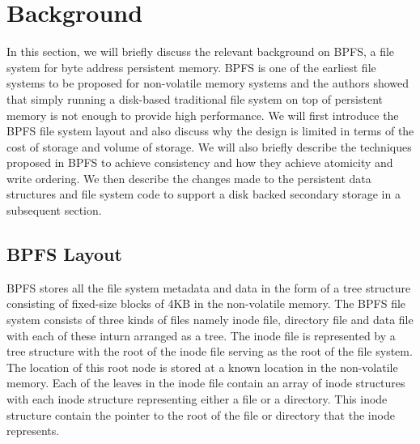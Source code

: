 \section{Background}
\label{sec-bg}
In this section, we will briefly discuss the relevant background on BPFS, a file system for byte address persistent memory. BPFS is one of the earliest file systems to be proposed for non-volatile memory systems and the authors showed that simply running a disk-based traditional file system on top of persistent memory is not enough to provide high performance. We will first introduce the BPFS file system layout and also discuss why the design is limited in terms of the cost of storage and volume of storage. We will also briefly describe the techniques proposed in BPFS to achieve consistency and how they achieve atomicity and write ordering. We then describe the changes made to the persistent data structures and file system code to support a disk backed secondary storage in a subsequent section.

\subsection{BPFS Layout}
BPFS stores all the file system metadata and data in the form of a tree structure consisting of fixed-size blocks of 4KB in the non-volatile memory. The BPFS file system consists of three kinds of files namely inode file, directory file and data file with each of these inturn arranged as a tree. The inode file is represented by a tree structure with the root of the inode file serving as the root of the file system. The location of this root node is stored at a known location in the non-volatile memory. Each of the leaves in the inode file contain an array of inode structures with each inode structure representing either a file or a directory. This inode structure contain the pointer to the root of the file or directory that the inode represents.
